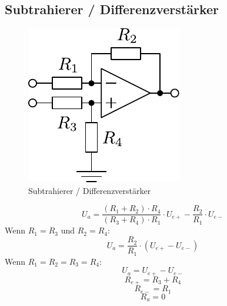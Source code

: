 



\subsection{Subtrahierer / Differenzverstärker}
\begin{figure}[h!]
	\centering
	\includegraphics[scale=\schscale]{../fig/op_sub.pdf}
	\caption{Subtrahierer / Differenzverstärker}
	\label{sch:op-sub}
\end{figure}
\[ U_a = \frac{(R_1 + R_2) \cdot R_4}{(R_3 + R_4) \cdot R_1} \cdot U_{e+} 
- \frac{R_2}{R_1} \cdot U_{e-} \]
Wenn $R_1 = R_3$ und $R_2 = R_4$: 
\[ U_a = \frac{R_2}{R_1} \cdot (U_{e+} - U_{e-}) \]
Wenn $R_1 = R_2 = R_3 = R_4$: 
\[ U_a = U_{e+} - U_{e-} \]
\[ R_{e+} = R_3 + R_4 \]
\[ R_{e-} = R_1 \]
\[ R_a = 0 \]